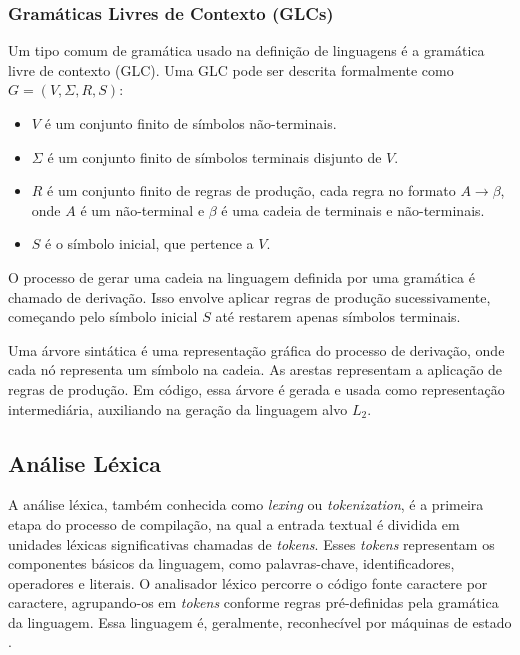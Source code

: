 \documentclass[english, 
               brazil, 
               bsc] %
               {dcomp-abntex2}
\begin{document}
\subsubsection{Gramáticas Livres de Contexto (GLCs)}

Um tipo comum de gramática usado na definição de linguagens é a gramática livre de contexto (GLC).  Uma GLC pode ser descrita formalmente como $ G=(V,\Sigma,R,S)$:

\begin{itemize}
  \item $V$ é um conjunto finito de símbolos não-terminais.

  \item $\Sigma$ é um conjunto finito de símbolos terminais disjunto de $V$.

  \item $R$ é um conjunto finito de regras de produção, cada regra no formato $A \rightarrow \beta$, onde $A$ é um não-terminal e $\beta$ é uma cadeia de terminais e não-terminais.

  \item $S$ é o símbolo inicial, que pertence a $V$.
\end{itemize}

O processo de gerar uma cadeia na linguagem definida por uma gramática é chamado de derivação. Isso envolve aplicar regras de produção sucessivamente, começando pelo símbolo inicial $S$ até restarem apenas símbolos terminais.

Uma árvore sintática é uma representação gráfica do processo de derivação, onde cada nó representa um símbolo na cadeia. As arestas representam a aplicação de regras de produção. Em código, essa árvore é gerada e usada como representação intermediária,  auxiliando na geração da linguagem alvo $L_2$.


\subsection{Análise Léxica}
A análise léxica, também conhecida como \textit{lexing} ou \textit{tokenization}, é a primeira etapa do processo de compilação, na qual a entrada textual é dividida em unidades léxicas significativas chamadas de \textit{tokens}. Esses \textit{tokens} representam os componentes básicos da linguagem, como palavras-chave, identificadores, operadores e literais. O analisador léxico percorre o código fonte caractere por caractere, agrupando-os em \textit{tokens} conforme regras pré-definidas pela gramática da linguagem. Essa linguagem é, geralmente, reconhecível por máquinas de estado \cite{automata}.
\end{document}
